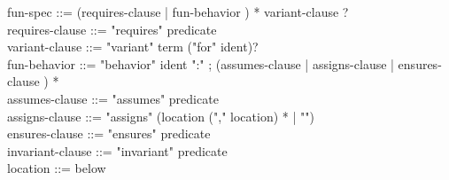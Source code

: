 \begin{syntax}
  fun-spec ::= (requires-clause | fun-behavior ) * variant-clause ? \\
  requires-clause ::= "requires" predicate \\
  variant-clause ::= "variant" term ("for" ident)? \\
  fun-behavior ::= "behavior" ident ":" ;
             (assumes-clause | assigns-clause |
              ensures-clause ) * \\
  assumes-clause ::= "assumes" predicate \\
  assigns-clause ::= "assigns" (location ("," location) * |
  "\nothing") \\
  ensures-clause ::= "ensures" predicate \\
  invariant-clause ::= "invariant" predicate \\
  location ::= below
\end{syntax}
